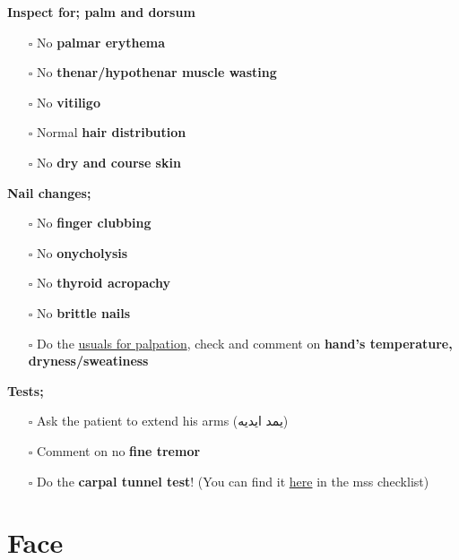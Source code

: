 \documentclass[
  13.5pt,
  a4paper,
  DIV=11,
  numbers=noendperiod]{scrreprt}
\providecommand{\tightlist}{%
  \setlength{\itemsep}{0pt}\setlength{\parskip}{0pt}}
\begin{document}
\textbf{Inspect for; palm and dorsum}

\begin{itemize}
\tightlist
\item[$\square$]
  No \textbf{palmar erythema}
\item[$\square$]
  No \textbf{thenar/hypothenar muscle wasting}
\item[$\square$]
  No \textbf{vitiligo}
\item[$\square$]
  Normal \textbf{hair distribution}
\item[$\square$]
  No \textbf{dry and course skin}
\end{itemize}

\textbf{Nail changes;}

\begin{itemize}
\tightlist
\item[$\square$]
  No \textbf{finger clubbing}
\item[$\square$]
  No \textbf{onycholysis}
\item[$\square$]
  No \textbf{thyroid acropachy}
\item[$\square$]
  No \textbf{brittle nails}
\item[$\square$]
  Do the \href{miscellaneous.qmd}{usuals for palpation}, check and
  comment on \textbf{hand's temperature, dryness/sweatiness}
\end{itemize}

\textbf{Tests;}

\begin{itemize}
\tightlist
\item[$\square$]
  Ask the patient to extend his arms (يمد ايديه)
\item[$\square$]
  Comment on no \textbf{fine tremor}
\item[$\square$]
  Do the \textbf{carpal tunnel test}! (You can find it
  \href{mss.qmd}{here} in the mss checklist)
\end{itemize}


\chapter{Face}\label{face-3}
\end{document}
